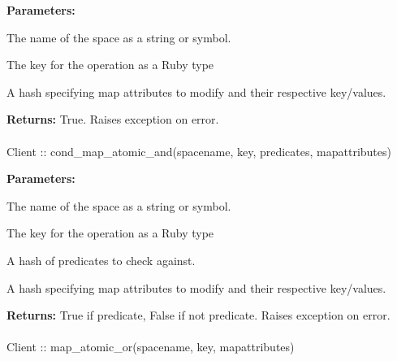 \noindent\textbf{Parameters:}
\begin{description}[labelindent=\widthof{{\code{mapattributes}}},leftmargin=*,noitemsep,nolistsep,align=right]
\item[\code{spacename}] The name of the space as a string or symbol.
\item[\code{key}] The key for the operation as a Ruby type
\item[\code{mapattributes}] A hash specifying map attributes to modify and their respective key/values.
\end{description}

\noindent\textbf{Returns:}
True.  Raises exception on error.

\paragraph{}
\begin{ccode}
Client :: cond_map_atomic_and(spacename, key, predicates, mapattributes)
\end{ccode}
\funcdesc 

\noindent\textbf{Parameters:}
\begin{description}[labelindent=\widthof{{\code{mapattributes}}},leftmargin=*,noitemsep,nolistsep,align=right]
\item[\code{spacename}] The name of the space as a string or symbol.
\item[\code{key}] The key for the operation as a Ruby type
\item[\code{predicates}] A hash of predicates to check against.
\item[\code{mapattributes}] A hash specifying map attributes to modify and their respective key/values.
\end{description}

\noindent\textbf{Returns:}
True if predicate, False if not predicate.  Raises exception on error.

\paragraph{}
\begin{ccode}
Client :: map_atomic_or(spacename, key, mapattributes)
\end{ccode}
\funcdesc 

